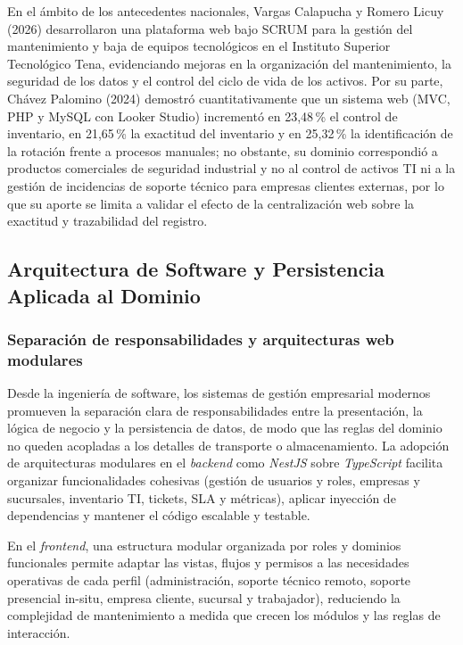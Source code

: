 En el ámbito de los antecedentes nacionales, Vargas Calapucha y Romero Licuy (2026) desarrollaron una plataforma web bajo SCRUM para la gestión del mantenimiento y baja de equipos tecnológicos en el Instituto Superior Tecnológico Tena, evidenciando mejoras en la organización del mantenimiento, la seguridad de los datos y el control del ciclo de vida de los activos. Por su parte, Chávez Palomino (2024) demostró cuantitativamente que un sistema web (MVC, PHP y MySQL con Looker Studio) incrementó en 23,48\,\% el control de inventario, en 21,65\,\% la exactitud del inventario y en 25,32\,\% la identificación de la rotación frente a procesos manuales; no obstante, su dominio correspondió a productos comerciales de seguridad industrial y no al control de activos TI ni a la gestión de incidencias de soporte técnico para empresas clientes externas, por lo que su aporte se limita a validar el efecto de la centralización web sobre la exactitud y trazabilidad del registro.

\subsection{Arquitectura de Software y Persistencia Aplicada al Dominio}

\subsubsection{Separación de responsabilidades y arquitecturas web modulares}
Desde la ingeniería de software, los sistemas de gestión empresarial modernos promueven la separación clara de responsabilidades entre la presentación, la lógica de negocio y la persistencia de datos, de modo que las reglas del dominio no queden acopladas a los detalles de transporte o almacenamiento. La adopción de arquitecturas modulares en el \textit{backend} como \textit{NestJS} sobre \textit{TypeScript} facilita organizar funcionalidades cohesivas (gestión de usuarios y roles, empresas y sucursales, inventario TI, tickets, SLA y métricas), aplicar inyección de dependencias y mantener el código escalable y testable.

En el \textit{frontend}, una estructura modular organizada por roles y dominios funcionales permite adaptar las vistas, flujos y permisos a las necesidades operativas de cada perfil (administración, soporte técnico remoto, soporte presencial in-situ, empresa cliente, sucursal y trabajador), reduciendo la complejidad de mantenimiento a medida que crecen los módulos y las reglas de interacción.

